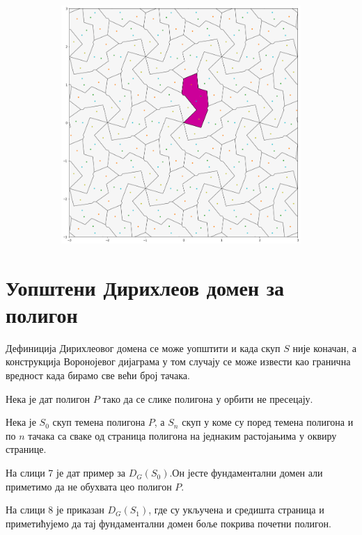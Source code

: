\documentclass[12pt]{report}
\begin{document}
\begin{samepage}
\begin{figure}[H]
\begin{subfigure}[b]{0.32\textwidth}
    \label{fig:f5}
  \end{subfigure}
  \begin{subfigure}[b]{0.32\textwidth}
    \includegraphics[width=.9\textwidth]{visetacaka3.png}
    \label{fig:f6}
  \end{subfigure}
\end{figure}
\end{samepage}

    \section{Уопштени Дирихлеов домен за полигон}\label{modifikacija-fundamentalne-oblasti-na-osnovu-podfundamentalne}
Дефиниција Дирихлеовог домена се може уопштити и када скуп $S$ није коначан, а конструкција Воронојевог дијаграма у том случају се може извести као гранична вредност када бирамо све већи број тачака.

Нека је дат полигон $P$ тако да се слике полигона у орбити не пресецају. 


Нека је $S_0$ скуп темена полигона $P$, а $S_n$ скуп у коме су поред темена полигона и по $n$ тачака са сваке од страница полигона на једнаким растојањима у оквиру странице.

На слици 7 је дат пример за $D_G(S_0)$.Он јесте фундаментални домен али приметимо да не обухвата цео полигон $P$.

На слици 8 је приказан $D_G(S_1)$, где су укључена и средишта страница и приметићујемо да тај фундаментални домен боље покрива почетни полигон. 
\end{document}
